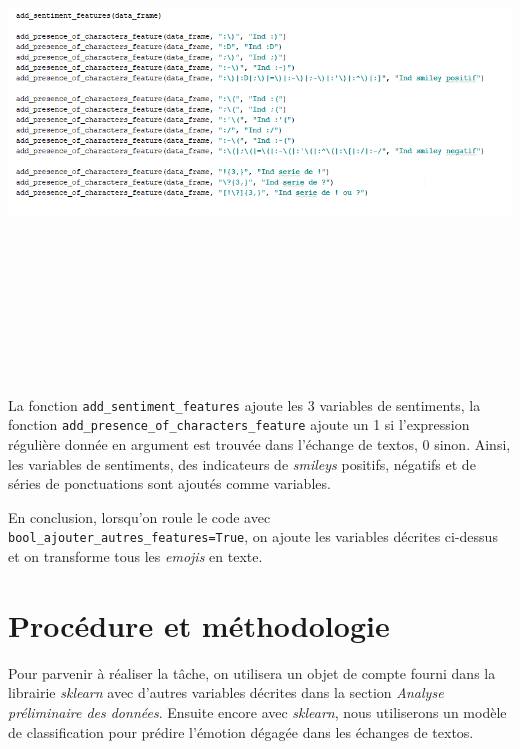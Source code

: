 \documentclass[12pt,french]{article}
\begin{document}
\includegraphics[width=\linewidth,height=14cm]{variables_autres}

La fonction \verb|add_sentiment_features| ajoute les 3 variables de sentiments, la fonction \verb|add_presence_of_characters_feature| ajoute un 1 si l'expression régulière donnée en argument est trouvée dans l'échange de textos, 0 sinon. Ainsi, les variables de sentiments, des indicateurs de \emph{smileys} positifs, négatifs et de séries de ponctuations sont ajoutés comme variables.

En conclusion, lorsqu'on roule le code avec \verb|bool_ajouter_autres_features=True|, on ajoute les variables décrites ci-dessus et on transforme tous les \emph{emojis} en texte.







\clearpage
\section{Procédure et méthodologie}
Pour parvenir à réaliser la tâche, on utilisera un objet de compte fourni dans la librairie \emph{sklearn} avec d'autres variables décrites dans la section \emph{Analyse préliminaire des données}. Ensuite encore avec \emph{sklearn}, nous utiliserons un modèle de classification pour prédire l'émotion dégagée dans les échanges de textos.
\end{document}
